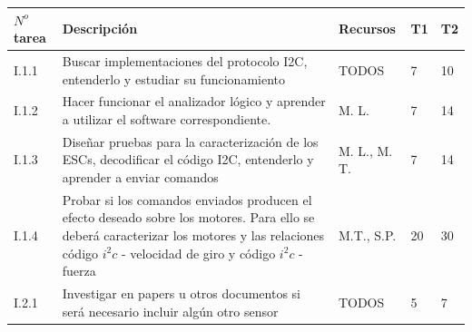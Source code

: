 \documentclass[spanish,12pt,a4paper,titlepage]{report}
\begin{document}
\begin{table}[H]
\begin{tabular}{|p{50pt}|p{220pt}|p{60pt}|p{20pt}|p{20pt}|} 
\hline
\cellcolor[gray]{0.8} $N^o$ \textbf{tarea} & \cellcolor[gray]{0.8} \textbf{Descripción} & \cellcolor[gray]{0.8} \textbf{Recursos} & \cellcolor[gray]{0.8} \textbf{T1} & \cellcolor[gray]{0.8} \textbf{T2} \\ \hline
I.1.1  & Buscar implementaciones del protocolo I2C, entenderlo y estudiar su funcionamiento & TODOS & 7 & 10\\ \hline
I.1.2  & Hacer funcionar el analizador lógico y aprender a utilizar el software correspondiente. & M. L. & 7 & 14\\ \hline
I.1.3  & Diseñar pruebas para la caracterización de los ESCs, decodificar el código I2C, entenderlo y aprender a enviar comandos & M. L., M. T. & 7 & 14\\ \hline
I.1.4  & Probar si los comandos enviados producen el efecto deseado sobre los motores. Para ello se deberá caracterizar los motores y las relaciones código $i^2c$ - velocidad de giro y código $i^2c$ - fuerza & M.T., S.P. & 20 & 30\\ \hline
I.2.1  & Investigar en papers u otros documentos si será necesario incluir algún otro sensor & TODOS & 5 & 7 \\ \hline
\end{tabular}
\end{table}
\end{document}
